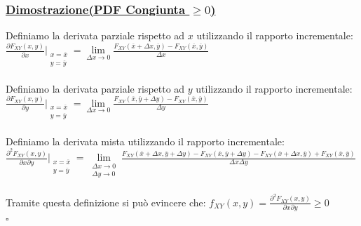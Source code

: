\documentclass{article}
\begin{document}
\subsubsection{\underline{Dimostrazione(PDF Congiunta $\geq 0$)}}
Definiamo la derivata parziale rispetto ad $x$ utilizzando il rapporto incrementale: \\
$\frac{\partial F_{XY}(x,y)}{\partial x} \Big|_{\begin{matrix} x = \overline x \\ y = \overline y \end{matrix}} = \underset{\Delta x \to 0}{\lim} \frac{F_{XY}(\overline x + \Delta x, \overline y) - F_{XY}(\overline x, \overline y)}{\Delta x}$ \\ \\
Definiamo la derivata parziale rispetto ad $y$ utilizzando il rapporto incrementale: \\
$\frac{\partial F_{XY}(x,y)}{\partial y} \Big|_{\begin{matrix} x = \overline x \\ y = \overline y \end{matrix}} = \underset{\Delta x \to 0}{\lim} \frac{F_{XY}(\overline x, \overline y + \Delta y) - F_{XY}(\overline x, \overline y)}{\Delta y}$ \\ \\
Definiamo la derivata mista utilizzando il rapporto incrementale: \\
$\frac{\partial^2 F_{XY}(x,y)}{\partial x \partial y} \Big|_{\begin{matrix} x = \overline x \\ y = \overline y \end{matrix}} = \underset{\begin{matrix} \Delta x \to 0  \\ \Delta y \to 0 \end{matrix}}{\lim} \frac{F_{XY}(\overline x + \Delta x, \overline y + \Delta y) - F_{XY}(\overline x, \overline y + \Delta y) - F_{XY}(\overline x + \Delta x, \overline y) + F_{XY}(\overline x, \overline y)}{\Delta x\Delta y} $ \\ \\
Tramite questa definizione si può evincere che: $f_{XY}(x,y) = \frac{\partial^2 F_{XY}(x,y)}{\partial x \partial y} \geq 0$ \\
\hspace*{0pt}\hfill $\square$ 
\end{document}
